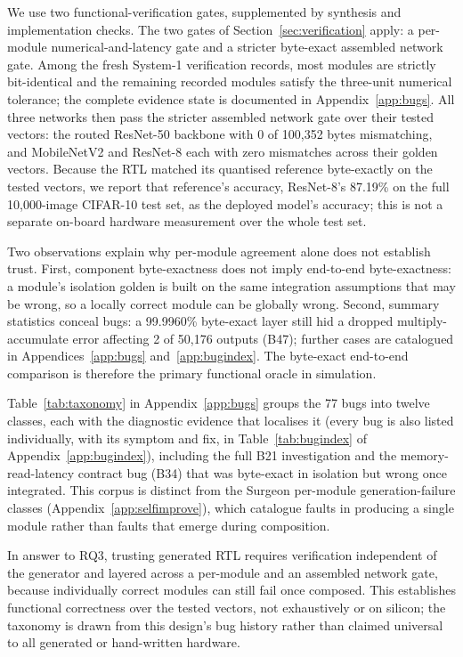 \documentclass[acmtog,authorversion]{acmart}
\begin{document}
We use two functional-verification gates, supplemented by synthesis and implementation checks. The two gates of Section~\ref{sec:verification} apply: a per-module numerical-and-latency gate and a stricter byte-exact assembled network gate. Among the fresh System-1 verification records, most modules are strictly bit-identical and the remaining recorded modules satisfy the three-unit numerical tolerance; the complete evidence state is documented in Appendix~\ref{app:bugs}. All three networks then pass the stricter assembled network gate over their tested vectors: the routed ResNet-50 backbone with 0 of 100,352 bytes mismatching, and MobileNetV2 and ResNet-8 each with zero mismatches across their golden vectors. Because the RTL matched its quantised reference byte-exactly on the tested vectors, we report that reference's accuracy, ResNet-8's 87.19\% on the full 10,000-image CIFAR-10 test set, as the deployed model's accuracy; this is not a separate on-board hardware measurement over the whole test set.

Two observations explain why per-module agreement alone does not establish trust. First, component byte-exactness does not imply end-to-end byte-exactness: a module's isolation golden is built on the same integration assumptions that may be wrong, so a locally correct module can be globally wrong. Second, summary statistics conceal bugs: a 99.9960\% byte-exact layer still hid a dropped multiply-accumulate error affecting 2 of 50,176 outputs (B47); further cases are catalogued in Appendices~\ref{app:bugs} and~\ref{app:bugindex}. The byte-exact end-to-end comparison is therefore the primary functional oracle in simulation.

Table~\ref{tab:taxonomy} in Appendix~\ref{app:bugs} groups the 77 bugs into twelve classes, each with the diagnostic evidence that localises it (every bug is also listed individually, with its symptom and fix, in Table~\ref{tab:bugindex} of Appendix~\ref{app:bugindex}), including the full B21 investigation and the memory-read-latency contract bug (B34) that was byte-exact in isolation but wrong once integrated. This corpus is distinct from the Surgeon per-module generation-failure classes (Appendix~\ref{app:selfimprove}), which catalogue faults in producing a single module rather than faults that emerge during composition.

In answer to RQ3, trusting generated RTL requires verification independent of the generator and layered across a per-module and an assembled network gate, because individually correct modules can still fail once composed. This establishes functional correctness over the tested vectors, not exhaustively or on silicon; the taxonomy is drawn from this design's bug history rather than claimed universal to all generated or hand-written hardware.
\end{document}
